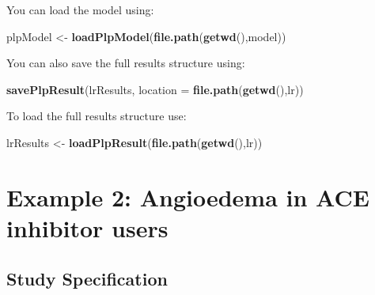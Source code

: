 \documentclass[
]{article}
\newenvironment{Shaded}{\begin{snugshade}}{\end{snugshade}}
\newcommand{\AttributeTok}[1]{\textcolor[rgb]{0.13,0.29,0.53}{#1}}
\newcommand{\FunctionTok}[1]{\textcolor[rgb]{0.13,0.29,0.53}{\textbf{#1}}}
\newcommand{\NormalTok}[1]{#1}
\newcommand{\OtherTok}[1]{\textcolor[rgb]{0.56,0.35,0.01}{#1}}
\newcommand{\StringTok}[1]{\textcolor[rgb]{0.31,0.60,0.02}{#1}}
\begin{document}
You can load the model using:

\begin{Shaded}
\begin{Highlighting}[]
\NormalTok{  plpModel }\OtherTok{\textless{}{-}} \FunctionTok{loadPlpModel}\NormalTok{(}\FunctionTok{file.path}\NormalTok{(}\FunctionTok{getwd}\NormalTok{(),}\StringTok{\textquotesingle{}model\textquotesingle{}}\NormalTok{))}
\end{Highlighting}
\end{Shaded}

You can also save the full results structure using:

\begin{Shaded}
\begin{Highlighting}[]
  \FunctionTok{savePlpResult}\NormalTok{(lrResults, }\AttributeTok{location =} \FunctionTok{file.path}\NormalTok{(}\FunctionTok{getwd}\NormalTok{(),}\StringTok{\textquotesingle{}lr\textquotesingle{}}\NormalTok{))}
\end{Highlighting}
\end{Shaded}

To load the full results structure use:

\begin{Shaded}
\begin{Highlighting}[]
\NormalTok{  lrResults }\OtherTok{\textless{}{-}} \FunctionTok{loadPlpResult}\NormalTok{(}\FunctionTok{file.path}\NormalTok{(}\FunctionTok{getwd}\NormalTok{(),}\StringTok{\textquotesingle{}lr\textquotesingle{}}\NormalTok{))}
\end{Highlighting}
\end{Shaded}

\newpage

\hypertarget{example2}{%
\section{Example 2: Angioedema in ACE inhibitor users}\label{example2}}

\hypertarget{study-specification-2}{%
\subsection{Study Specification}\label{study-specification-2}}
\end{document}
